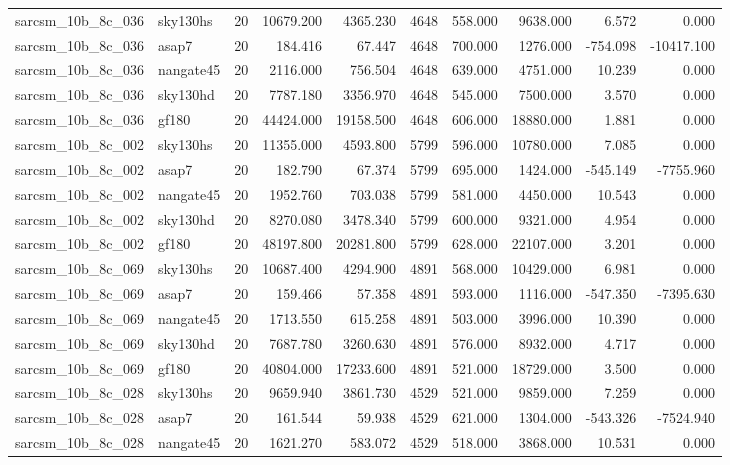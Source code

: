 \begin{longtable}{llrrrrrrrr}
sarcsm\_10b\_8c\_036 & sky130hs & 20 & 10679.200 & 4365.230 & 4648 & 558.000 & 9638.000 & 6.572 & 0.000 \\
sarcsm\_10b\_8c\_036 & asap7 & 20 & 184.416 & 67.447 & 4648 & 700.000 & 1276.000 & -754.098 & -10417.100 \\
sarcsm\_10b\_8c\_036 & nangate45 & 20 & 2116.000 & 756.504 & 4648 & 639.000 & 4751.000 & 10.239 & 0.000 \\
sarcsm\_10b\_8c\_036 & sky130hd & 20 & 7787.180 & 3356.970 & 4648 & 545.000 & 7500.000 & 3.570 & 0.000 \\
sarcsm\_10b\_8c\_036 & gf180 & 20 & 44424.000 & 19158.500 & 4648 & 606.000 & 18880.000 & 1.881 & 0.000 \\
sarcsm\_10b\_8c\_002 & sky130hs & 20 & 11355.000 & 4593.800 & 5799 & 596.000 & 10780.000 & 7.085 & 0.000 \\
sarcsm\_10b\_8c\_002 & asap7 & 20 & 182.790 & 67.374 & 5799 & 695.000 & 1424.000 & -545.149 & -7755.960 \\
sarcsm\_10b\_8c\_002 & nangate45 & 20 & 1952.760 & 703.038 & 5799 & 581.000 & 4450.000 & 10.543 & 0.000 \\
sarcsm\_10b\_8c\_002 & sky130hd & 20 & 8270.080 & 3478.340 & 5799 & 600.000 & 9321.000 & 4.954 & 0.000 \\
sarcsm\_10b\_8c\_002 & gf180 & 20 & 48197.800 & 20281.800 & 5799 & 628.000 & 22107.000 & 3.201 & 0.000 \\
sarcsm\_10b\_8c\_069 & sky130hs & 20 & 10687.400 & 4294.900 & 4891 & 568.000 & 10429.000 & 6.981 & 0.000 \\
sarcsm\_10b\_8c\_069 & asap7 & 20 & 159.466 & 57.358 & 4891 & 593.000 & 1116.000 & -547.350 & -7395.630 \\
sarcsm\_10b\_8c\_069 & nangate45 & 20 & 1713.550 & 615.258 & 4891 & 503.000 & 3996.000 & 10.390 & 0.000 \\
sarcsm\_10b\_8c\_069 & sky130hd & 20 & 7687.780 & 3260.630 & 4891 & 576.000 & 8932.000 & 4.717 & 0.000 \\
sarcsm\_10b\_8c\_069 & gf180 & 20 & 40804.000 & 17233.600 & 4891 & 521.000 & 18729.000 & 3.500 & 0.000 \\
sarcsm\_10b\_8c\_028 & sky130hs & 20 & 9659.940 & 3861.730 & 4529 & 521.000 & 9859.000 & 7.259 & 0.000 \\
sarcsm\_10b\_8c\_028 & asap7 & 20 & 161.544 & 59.938 & 4529 & 621.000 & 1304.000 & -543.326 & -7524.940 \\
sarcsm\_10b\_8c\_028 & nangate45 & 20 & 1621.270 & 583.072 & 4529 & 518.000 & 3868.000 & 10.531 & 0.000 \\

\end{longtable}

